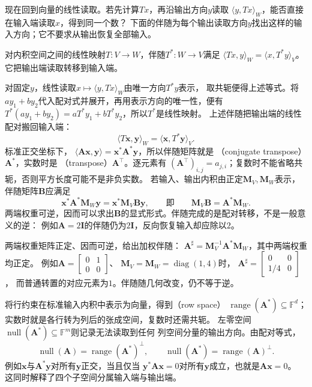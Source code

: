 现在回到向量的线性读取。若先计算$T x$，再沿输出方向$y$读取
$\langle y,Tx\rangle_W$，能否直接在输入端读取$x$，得到同一个数？
下面的伴随为每个输出读取方向$y$找出这样的输入方向；它不要求从输出恢复全部输入。
\begin{definition}[有限维伴随]
\label{def:linear-algebra-adjoint}
对内积空间之间的线性映射$T:V\to W$，伴随$T^*:W\to V$满足
$\langle Tx,y\rangle_W=\langle x,T^*y\rangle_V$。
它把输出端读取转移到输入端。
\end{definition}
对固定$y$，线性读取$x\mapsto\langle y,Tx\rangle_W$由唯一方向$T^*y$表示，
取共轭便得上述等式。将$ay_1+by_2$代入配对式并展开，再用表示方向的唯一性，便有
$T^*(ay_1+by_2)=aT^*y_1+bT^*y_2$，所以$T^*$是线性映射。
上述伴随把输出端的线性配对搬回输入端：
\[
 \langle T\bm x,\bm y\rangle_W=\langle\bm x,T^*\bm y\rangle_V.
\]
标准正交坐标下，
$\langle\bm A\bm x,\bm y\rangle=\bm x^*\bm A^*\bm y$，所以伴随矩阵就是
（conjugate transpose）$\bm A^*$，实数时是
（transpose）$\bm A^\top$。逐元素有
$(\bm A^\top)_{i,j}=a_{j,i}$；复数时不能省略共轭，否则平方长度可能不是非负实数。
若输入、输出内积由正定$\bm M_V,\bm M_W$表示，伴随矩阵$\bm B$应满足
\[
 \bm x^*\bm A^*\bm M_W\bm y=\bm x^*\bm M_V\bm B\bm y,
 \qquad\text{即}\qquad \bm M_V\bm B=\bm A^*\bm M_W.
\]
两端权重可逆，因而可以求出$\bm B$的显式形式。伴随完成的是配对转移，不是一般意义的逆：
例如$\bm A=2\bm I$的伴随仍为$2\bm I$，反向恢复输入却应除以$2$。


两端权重矩阵正定、因而可逆，给出加权伴随：
$\bm A^\sharp=\bm M_V^{-1}\bm A^*\bm M_W$，其中两端权重均正定。
例如$\bm A=\left[\begin{smallmatrix}0&1\\0&0\end{smallmatrix}\right]$、
$\bm M_V=\bm M_W=\operatorname{diag}(1,4)$时，
$\bm A^\sharp=\left[\begin{smallmatrix}0&0\\1/4&0\end{smallmatrix}\right]$，
而普通转置的对应元素为$1$。伴随随几何改变，仍不等于逆。


将行约束在标准输入内积中表示为向量，得到（row space）
$\operatorname{range}(\bm A^*)\subseteq\mathbb F^d$；
实数时就是各行转为列后的张成空间，复数时还需共轭。
左零空间$\operatorname{null}(\bm A^*)\subseteq\mathbb F^m$则记录无法读取到任何
列空间分量的输出方向。由配对等式，
\[
 \operatorname{null}(\bm A)=\operatorname{range}(\bm A^*)^\perp,\qquad
 \operatorname{null}(\bm A^*)=\operatorname{range}(\bm A)^\perp.
\]
例如$\bm x$与$\bm A^*\bm y$对所有$\bm y$正交，当且仅当
$\bm y^*\bm A\bm x=0$对所有$\bm y$成立，也就是$\bm A\bm x=0$。
这同时解释了四个子空间分属输入端与输出端。


